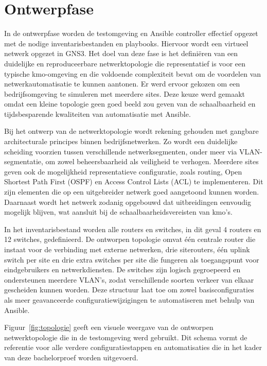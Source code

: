 \section{Ontwerpfase}
In de ontwerpfase worden de testomgeving en Ansible controller effectief opgezet met de nodige inventarisbestanden en playbooks. Hiervoor wordt een virtueel netwerk opgezet in GNS3.
Het doel van deze fase is het definiëren van een duidelijke en reproduceerbare netwerktopologie die representatief is voor een typische kmo-omgeving en die voldoende complexiteit bevat om de voordelen van netwerkautomatisatie te kunnen aantonen.
Er werd ervoor gekozen om een bedrijfsomgeving te simuleren met meerdere sites. Deze keuze werd gemaakt omdat een kleine topologie geen goed beeld zou geven van de schaalbaarheid en tijdsbesparende kwaliteiten van automatisatie met Ansible.


Bij het ontwerp van de netwerktopologie wordt rekening gehouden met gangbare architecturale principes binnen bedrijfsnetwerken.
Zo wordt een duidelijke scheiding voorzien tussen verschillende netwerksegmenten, onder meer via VLAN-segmentatie, om zowel beheersbaarheid als veiligheid te verhogen.
Meerdere sites geven ook de mogelijkheid representatieve configuratie, zoals routing, Open Shortest Path First (OSPF) en Access Control Lists (ACL) te implementeren. Dit zijn elementen die op een uitgebreider netwerk goed aangetoond kunnen worden. 
Daarnaast wordt het netwerk zodanig opgebouwd dat uitbreidingen eenvoudig mogelijk blijven, wat aansluit bij de schaalbaarheidsvereisten van kmo's.

In het inventarisbestand worden alle routers en switches, in dit geval 4 routers en 12 switches, gedefinieerd. 
De ontworpen topologie omvat één centrale router die instaat voor de verbinding met externe netwerken, drie siterouters, één uplink switch per site en drie extra switches per site die fungeren als toegangspunt voor eindgebruikers en netwerkdiensten.
De switches zijn logisch gegroepeerd en ondersteunen meerdere VLAN's, zodat verschillende soorten verkeer van elkaar gescheiden kunnen worden.
Deze structuur laat toe om zowel basisconfiguraties als meer geavanceerde configuratiewijzigingen te automatiseren met behulp van Ansible.

Figuur~\ref{fig:topologie} geeft een visuele weergave van de ontworpen netwerktopologie die in de testomgeving werd gebruikt.
Dit schema vormt de referentie voor alle verdere configuratiestappen en automatisaties die in het kader van deze bachelorproef worden uitgevoerd.

